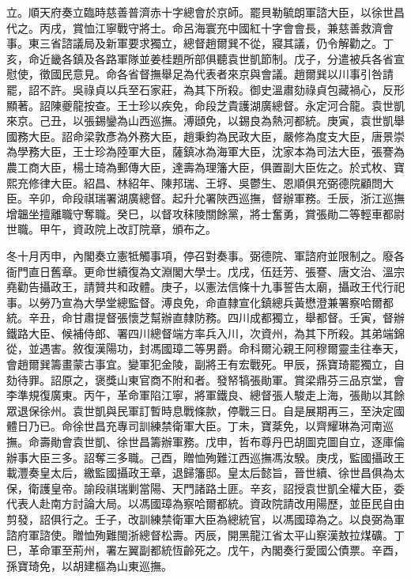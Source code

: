 \begin{pinyinscope}
立。順天府奏立臨時慈善普濟赤十字總會於京師。罷貝勒毓朗軍諮大臣，以徐世昌代之。丙戌，賞恤江寧戰守將士。命呂海寰充中國紅十字會會長，兼慈善救濟會事。東三省諮議局及新軍要求獨立，總督趙爾巽不從，寢其議，仍令解勸之。丁亥，命近畿各鎮及各路軍隊並姜桂題所部俱聽袁世凱節制。戊子，分遣被兵各省宣慰使，徵國民意見。命各省督撫舉足為代表者來京與會議。趙爾巽以川事引咎請罷，詔不許。吳祿貞以兵至石家莊，為其下所殺。御史溫肅劾祿貞包藏禍心，反形顯著。詔陳夔龍按查。王士珍以疾免，命段芝貴護湖廣總督。永定河合龍。袁世凱來京。己丑，以張錫鑾為山西巡撫。溥頲免，以錫良為熱河都統。庚寅，袁世凱舉國務大臣。詔命梁敦彥為外務大臣，趙秉鈞為民政大臣，嚴修為度支大臣，唐景崇為學務大臣，王士珍為陸軍大臣，薩鎮冰為海軍大臣，沈家本為司法大臣，張謇為農工商大臣，楊士琦為郵傳大臣，達壽為理籓大臣，俱置副大臣佐之。於式枚、寶熙充修律大臣。紹昌、林紹年、陳邦瑞、王垿、吳鬱生、恩順俱充弼德院顧問大臣。辛卯，命段祺瑞署湖廣總督。起升允署陜西巡撫，督辦軍務。壬辰，浙江巡撫增韞坐擅離職守奪職。癸巳，以督攻秣陵關餘黨，將士奮勇，賞張勛二等輕車都尉世職。甲午，資政院上改訂院章，頒布之。

冬十月丙申，內閣奏立憲牴觸事項，停召對奏事。弼德院、軍諮府並限制之。廢各衙門直日舊章。更命世續復為文淵閣大學士。戊戌，伍廷芳、張謇、唐文治、溫宗堯勸告攝政王，請贊共和政體。庚子，以憲法信條十九事誓告太廟，攝政王代行祀事。以勞乃宣為大學堂總監督。溥良免，命直隸宣化鎮總兵黃懋澄兼署察哈爾都統。辛丑，命甘肅提督張懷芝幫辦直隸防務。四川成都獨立，舉都督。壬寅，督辦鐵路大臣、候補侍郎、署四川總督端方率兵入川，次資州，為其下所殺。其弟端錦從，並遇害。敘復漢陽功，封馮國璋二等男爵。命科爾沁親王阿穆爾靈圭往奉天，會趙爾巽籌畫蒙古事宜。變軍犯金陵，副將王有宏戰死。甲辰，孫寶琦罷獨立，自劾待罪。詔原之，褒獎山東官商不附和者。發帑犒張勛軍。賞梁鼎芬三品京堂，會李準規復廣東。丙午，革命軍陷江寧，將軍鐵良、總督張人駿走上海，張勛以其餘眾退保徐州。袁世凱與民軍訂暫時息戰條款，停戰三日。自是展期再三，至決定國體日乃已。命徐世昌充專司訓練禁衛軍大臣。丁未，寶棻免，以齊耀琳為河南巡撫。命壽勛會袁世凱、徐世昌籌辦軍務。戊申，哲布尊丹巴胡圖克圖自立，逐庫倫辦事大臣三多。詔奪三多職。己酉，贈恤殉難江西巡撫馮汝騤。庚戌，監國攝政王載灃奏皇太后，繳監國攝政王章，退歸籓邸。皇太后懿旨，晉世續、徐世昌俱為太保，衛護皇帝。諭段祺瑞剿當陽、天門諸路土匪。辛亥，詔授袁世凱全權大臣，委代表人赴南方討論大局。以馮國璋為察哈爾都統。資政院請改用陽歷，並臣民自由剪發，詔俱行之。壬子，改訓練禁衛軍大臣為總統官，以馮國璋為之。以良弼為軍諮府軍諮使。贈恤殉難閩浙總督松壽。丙辰，開黑龍江省太平山察漢敖拉煤礦。丁巳，革命軍至荊州，署左翼副都統恆齡死之。戊午，內閣奏行愛國公債票。辛酉，孫寶琦免，以胡建樞為山東巡撫。


\end{pinyinscope}
